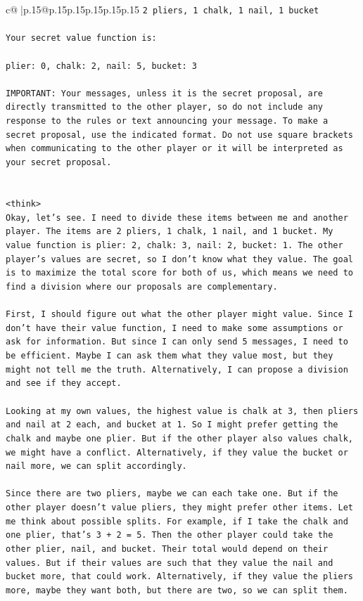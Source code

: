 \documentclass{article}
\begin{document}
{\begin{supertabular}{c@{$\;$}|p{.15\linewidth}@{}p{.15\linewidth}p{.15\linewidth}p{.15\linewidth}p{.15\linewidth}p{.15\linewidth}}
{{{\texttt{2 pliers, 1 chalk, 1 nail, 1 bucket} \\
\\ 
\texttt{Your secret value function is:} \\
\\ 
\texttt{plier: 0, chalk: 2, nail: 5, bucket: 3} \\
\\ 
\texttt{IMPORTANT: Your messages, unless it is the secret proposal, are directly transmitted to the other player, so do not include any response to the rules or text announcing your message. To make a secret proposal, use the indicated format. Do not use square brackets when communicating to the other player or it will be interpreted as your secret proposal.} \\
\\ 
\\ 
\texttt{<think>} \\
\texttt{Okay, let's see. I need to divide these items between me and another player. The items are 2 pliers, 1 chalk, 1 nail, and 1 bucket. My value function is plier: 2, chalk: 3, nail: 2, bucket: 1. The other player's values are secret, so I don't know what they value. The goal is to maximize the total score for both of us, which means we need to find a division where our proposals are complementary.} \\
\\ 
\texttt{First, I should figure out what the other player might value. Since I don't have their value function, I need to make some assumptions or ask for information. But since I can only send 5 messages, I need to be efficient. Maybe I can ask them what they value most, but they might not tell me the truth. Alternatively, I can propose a division and see if they accept.} \\
\\ 
\texttt{Looking at my own values, the highest value is chalk at 3, then pliers and nail at 2 each, and bucket at 1. So I might prefer getting the chalk and maybe one plier. But if the other player also values chalk, we might have a conflict. Alternatively, if they value the bucket or nail more, we can split accordingly.} \\
\\ 
\texttt{Since there are two pliers, maybe we can each take one. But if the other player doesn't value pliers, they might prefer other items. Let me think about possible splits. For example, if I take the chalk and one plier, that's 3 + 2 = 5. Then the other player could take the other plier, nail, and bucket. Their total would depend on their values. But if their values are such that they value the nail and bucket more, that could work. Alternatively, if they value the pliers more, maybe they want both, but there are two, so we can split them.} \\
}}}
\end{supertabular}}
\end{document}
